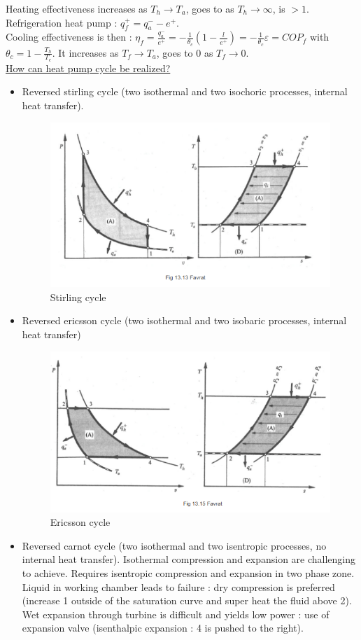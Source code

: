 \documentclass[../main.tex]{subfiles}
\begin{document}
Heating effectiveness increases as $T_h \rightarrow T_a$, goes to  as $T_h \rightarrow \infty$, is $> 1$.\\

Refrigeration heat pump : $q_f^+ = q_a^- - e^+$. \\
Cooling effectiveness is then : $\eta_f = \frac{q_a^-}{e^+} = -\frac{1}{\theta_c} (1-\frac{l}{e^+}) = -\frac{1}{\theta_c} \varepsilon = COP_f$ with $\theta_c = 1-\frac{T_h}{T_c}$. It increases as $T_f \rightarrow T_a$, goes to 0 as $T_f \rightarrow 0$.\\

\quad \underline{How can heat pump cycle be realized? }\\
\begin{itemize}
    \item Reversed stirling cycle (two isothermal and two isochoric processes, internal heat transfer). 
    \begin{figure}[hbt!]
        \centering
        \includegraphics[width=0.5\linewidth]{IMAGES/HP/Screenshot from 2025-03-13 10-19-30.png}
        \caption{Stirling cycle}
    \end{figure}

    \item Reversed ericsson cycle (two isothermal and two isobaric processes, internal heat transfer)
    \begin{figure}[hbt!]
        \centering
        \includegraphics[width=0.5\linewidth]{IMAGES/HP/Screenshot from 2025-03-13 10-21-33.png}
        \caption{Ericsson cycle}
    \end{figure}

    \item Reversed carnot cycle (two isothermal and two isentropic processes, no internal heat transfer). Isothermal compression and expansion are challenging to achieve. Requires isentropic compression and expansion in two phase zone. Liquid in working chamber leads to failure : dry compression is preferred (increase 1 outside of the saturation curve and super heat the fluid above 2). Wet expansion through turbine is difficult and yields low power : use of expansion valve (isenthalpic expansion : 4 is pushed to the right).
\end{itemize}
\end{document}

